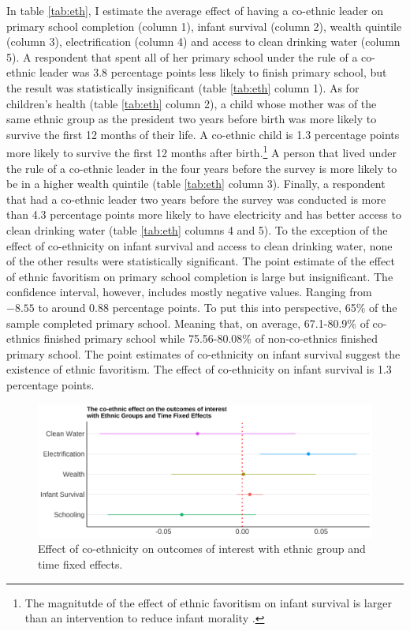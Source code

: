 \documentclass{wptemp}
\begin{document}
In table \ref{tab:eth},  I estimate the average effect of having a co-ethnic leader on primary school completion (column 1), infant survival (column 2), wealth quintile (column 3), electrification (column 4) and access to clean drinking water (column 5). A respondent that spent all of her primary school under the rule of a co-ethnic leader was $3.8$ percentage points less likely to finish primary school, but the result was statistically insignificant (table \ref{tab:eth} column 1). As for children's health (table \ref{tab:eth} column 2), a child whose mother was of the same ethnic group as the president two years before birth was more likely to survive the first 12 months of their life. A co-ethnic child is 1.3 percentage points more likely to survive the first 12 months after birth.\footnote{The magnitutde of the effect of ethnic favoritism on infant survival is larger than an intervention to reduce infant morality \citep{jones2003many}.} A person that lived under the rule of a co-ethnic leader in the four years before the survey is more likely to be in a higher wealth quintile (table \ref{tab:eth} column 3). Finally, a respondent that had a co-ethnic leader two years before the survey was conducted is more than 4.3 percentage points more likely to have electricity and has better access to clean drinking water (table \ref{tab:eth} columns 4 and 5). To the exception of the effect of co-ethnicity on infant survival and access to clean drinking water, none of the other results were statistically significant. The point estimate of the effect of ethnic favoritism on primary school completion is large but insignificant. The confidence interval, however, includes mostly negative values. Ranging from $-8.55$  to around $0.88$ percentage points. To put this into perspective, 65\% of the sample completed primary school. Meaning that, on average, 67.1-80.9\% of co-ethnics finished primary school while 75.56-80.08\% of non-co-ethnics finished primary school. The point estimates of co-ethnicity on infant survival suggest the existence of ethnic favoritism. The effect of co-ethnicity on infant survival is 1.3 percentage points.

\begin{figure}[!htb]
\includegraphics[width=.9\linewidth]{figure/coeth_ethFE.png}
\caption{Effect of co-ethnicity on outcomes of interest with ethnic group and time fixed effects.}
\label{fig:coeet}
\end{figure}
\end{document}
